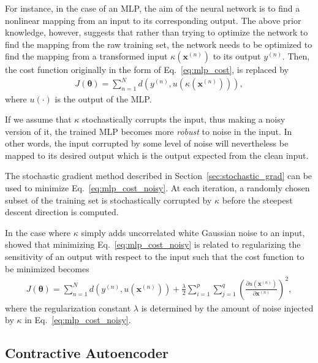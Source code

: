 \documentclass{now}
\newcommand{\vect}[1]{\mathbf{#1}}
\newcommand{\vects}[1]{\boldsymbol{#1}}
\newcommand{\vx}[0]{\vect{x}}
\newcommand{\TT}[0]{{\vects{\theta}}}
\begin{document}
For instance, in the case of an MLP, the aim of the neural
network is to find a nonlinear mapping from an input to its
corresponding output. The above prior knowledge, however,
suggests that rather than trying to optimize the network to
find the mapping from the raw training set, the network
needs to be optimized to find the mapping from a transformed
input $\kappa(\vx^{(n)})$ to its output $y^{(n)}$. Then, the
cost function originally in the form of
Eq.~\eqref{eq:mlp_cost}, is replaced by
\begin{align}
    \label{eq:mlp_cost_noisy}
    J(\TT) = \sum_{n=1}^N d\left(y^{(n)},
    u(\kappa(\vx^{(n)}))\right),
\end{align}
where $u(\cdot)$ is the output of the MLP.

If we assume that $\kappa$ stochastically corrupts the
input,
thus making a noisy version of it, the trained MLP becomes
more \textit{robust} to noise in the input. In other words,
the input corrupted by some level of noise will nevertheless
be mapped to its desired output which is the output expected
from the clean input. 

The stochastic gradient method
described in Section~\ref{sec:stochastic_grad} can be used to minimize
Eq.~\eqref{eq:mlp_cost_noisy}. At each iteration, a randomly
chosen subset of the training set is stochastically
corrupted by $\kappa$ before the steepest descent direction
is computed. 

In the case where $\kappa$ simply adds uncorrelated white
Gaussian noise to an input, \citet{Bishop1995} showed that
minimizing Eq.~\eqref{eq:mlp_cost_noisy} is related to
regularizing the sensitivity of an output with respect to
the input such that the cost function to be minimized
becomes
\begin{align}
    \label{eq:noise_injection_reg}
    J(\TT) = \sum_{n=1}^N d\left(y^{(n)},
    u(\vx^{(n)})\right) + \frac{\lambda}{2}
    \sum_{i=1}^p \sum_{j=1}^q \left( \frac{\partial
    u(\vx^{(n)})}{\partial \vx^{(n)}}\right)^2,
\end{align}
where the regularization constant $\lambda$ is determined by
the amount of noise injected by $\kappa$ in
Eq.~\eqref{eq:mlp_cost_noisy}.

\subsection{Contractive Autoencoder}
\end{document}

